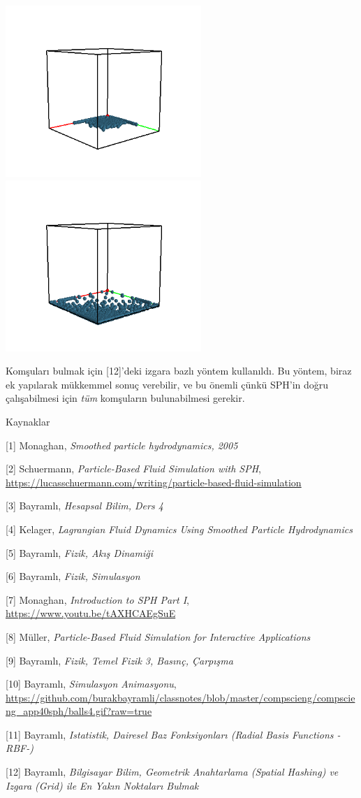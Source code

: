 \documentclass[12pt,fleqn]{article}\usepackage{../../common}
\begin{document}
\includegraphics[width=20em]{glutout-006.png}
\includegraphics[width=20em]{glutout-008.png}

Komşuları bulmak için [12]'deki izgara bazlı yöntem kullanıldı. Bu yöntem, biraz
ek yapılarak mükkemmel sonuç verebilir, ve bu önemli çünkü SPH'in doğru
çalışabilmesi için {\em tüm} komşuların bulunabilmesi gerekir.

Kaynaklar

[1] Monaghan, {\em Smoothed particle hydrodynamics, 2005}

[2] Schuermann, {\em Particle-Based Fluid Simulation with SPH},
    \url{https://lucasschuermann.com/writing/particle-based-fluid-simulation}

[3] Bayramlı, {\em Hesapsal Bilim, Ders 4}

[4] Kelager, {\em Lagrangian Fluid Dynamics Using Smoothed Particle Hydrodynamics}

[5] Bayramlı, {\em Fizik, Akış Dinamiği}

[6] Bayramlı, {\em Fizik, Simulasyon}

[7] Monaghan, {\em Introduction to SPH Part I},
    \url{https://www.youtu.be/tAXHCAEgSuE}

[8] Müller, {\em Particle-Based Fluid Simulation for Interactive Applications}

[9] Bayramlı, {\em Fizik, Temel Fizik 3, Basınç, Çarpışma}

[10] Bayramlı, {\em Simulasyon Animasyonu},
    \url{https://github.com/burakbayramli/classnotes/blob/master/compscieng/compscieng_app40sph/balls4.gif?raw=true}

[11] Bayramlı, {\em Istatistik, Dairesel Baz Fonksiyonları (Radial Basis Functions -RBF-)}

[12] Bayramlı, {\em Bilgisayar Bilim, Geometrik Anahtarlama (Spatial Hashing) ve Izgara (Grid) ile En Yakın Noktaları Bulmak}
\end{document}

